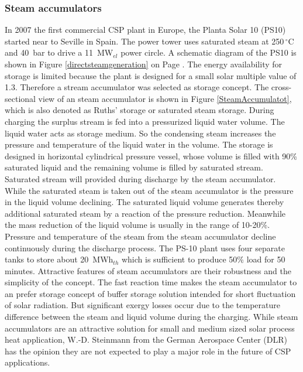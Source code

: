 \subsubsection{Steam accumulators}
In 2007 the first commercial CSP plant in Europe, the Planta Solar 10 (PS10) started near to Seville in Spain. The power tower uses saturated steam at 250$\,^{\circ}\mathrm{C}$ and 40~bar to drive a 11~MW$_{el}$ power circle. A schematic diagram of the PS10 is shown in Figure \ref{directsteamgeneration} on Page \pageref{directsteamgeneration}. The energy availability for storage is limited because the  plant is designed for a small solar multiple value of 1.3. Therefore a stream accumulator was selected as storage concept. The cross-sectional view of an steam accumulator is shown in Figure \ref{SteamAccumulatot}, which is also denoted as Ruths' storage or saturated steam storage. During charging the surplus stream is fed into a pressurized liquid water volume. The liquid water acts as storage medium. So the condensing steam increases the pressure and temperature of the liquid water in the volume. The storage is designed in horizontal cylindrical pressure vessel, whose volume is filled with 90\% saturated liquid and the remaining volume is filled by saturated stream. Saturated stream will provided during discharge by the steam accumulator. While the saturated steam is taken out of the steam accumulator is the pressure in the liquid volume declining. The saturated liquid volume generates thereby additional saturated steam by a reaction of the pressure reduction. Meanwhile the mass reduction of the liquid volume is usually in the range of 10-20\%. Pressure and temperature of the steam from the steam accumulator decline continuously during the discharge process. The PS-10 plant uses four separate tanks to store about 20~MWh$_{th}$ which is sufficient to produce 50\% load for 50 minutes. Attractive features of steam accumulators are their robustness and the simplicity of the concept. The fast reaction time makes the steam accumulator to an prefer storage concept of buffer storage solution intended for short fluctuation of solar radiation. But significant exergy losses occur due to the temperature difference between the steam and liquid volume during the charging. While steam accumulators are an attractive solution for small and medium sized solar process heat application, W.-D. Steinmann from the German Aerospace Center (DLR) \cite{Steinmann2015} has the opinion they are not expected to play a major role in the future of CSP applications. \cite{Richter2013}

